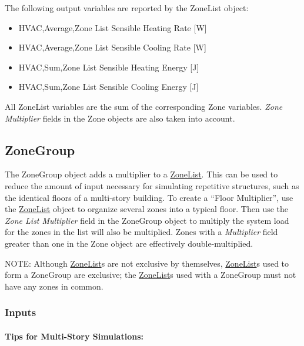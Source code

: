 The following output variables are reported by the ZoneList object:

\begin{itemize}
\item
  HVAC,Average,Zone List Sensible Heating Rate {[}W{]}
\item
  HVAC,Average,Zone List Sensible Cooling Rate {[}W{]}
\item
  HVAC,Sum,Zone List Sensible Heating Energy {[}J{]}
\item
  HVAC,Sum,Zone List Sensible Cooling Energy {[}J{]}
\end{itemize}

All ZoneList variables are the sum of the corresponding Zone variables. \emph{Zone Multiplier} fields in the Zone objects are also taken into account.

\subsection{ZoneGroup}\label{zonegroup}

The ZoneGroup object adds a multiplier to a \hyperref[zonelist]{ZoneList}. This can be used to reduce the amount of input necessary for simulating repetitive structures, such as the identical floors of a multi-story building. To create a ``Floor Multiplier'', use the \hyperref[zonelist]{ZoneList} object to organize several zones into a typical floor. Then use the \emph{Zone List Multiplier} field in the ZoneGroup object to multiply the system load for the zones in the list will also be multiplied. Zones with a \emph{Multiplier} field greater than one in the Zone object are effectively double-multiplied.

\begin{callout}
NOTE: Although \hyperref[zonelist]{ZoneList}s are not exclusive by themselves, \hyperref[zonelist]{ZoneList}s used to form a ZoneGroup are exclusive; the \hyperref[zonelist]{ZoneList}s used with a ZoneGroup must not have any zones in common.
\end{callout}

\subsubsection{Inputs}\label{inputs-2-042}

\paragraph{Tips for Multi-Story Simulations:}\label{tips-for-multi-story-simulations}

